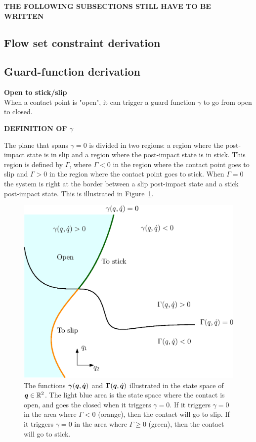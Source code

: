 \documentclass[../DC2017114Bouma.tex]{subfiles}
\begin{document}
\textbf{THE FOLLOWING SUBSECTIONS STILL HAVE TO BE WRITTEN}
\subsection{Flow set constraint derivation}\label{app:constraints}


\subsection{Guard-function derivation}\label{app:guards}
\textbf{Open to stick/slip}\\
When a contact point is "open", it can trigger a guard function $\gamma$ to go from open to closed.

\textbf{DEFINITION OF $\gamma$}

The plane that spans $\gamma = 0$ is divided in two regions: a region where the post-impact state is in slip and a region where the post-impact state is in stick. This region is defined by $\Gamma$, where $\Gamma<0$ in the region where the contact point goes to slip and $\Gamma > 0$ in the region where the contact point goes to stick. When $\Gamma = 0$ the system is right at the border between a slip post-impact state and a stick post-impact state. This is illustrated in Figure~\ref{fig:guardopcl}. 

\begin{figure}[H]
	\centering
	\includegraphics[width=.7\textwidth]{guardopcl.eps}\caption{The functions $\boldsymbol{\gamma}({\boldsymbol{q}},\dot{{\boldsymbol{q}}})$ and $\boldsymbol{\Gamma}({\boldsymbol{q}},\dot{{\boldsymbol{q}}})$ illustrated in the state space of ${\boldsymbol{q}}\in\mathbb{R}^{2}$. The light blue area is the state space where the contact is open, and goes the closed when it triggers $\gamma = 0$. If it triggers $\gamma = 0$ in the area where $\Gamma<0$ (orange), then the contact will go to slip. If it triggers $\gamma=0$ in the area where $\Gamma\geq 0$ (green), then the contact will go to stick.}\label{fig:guardopcl}
\end{figure}
\end{document}
